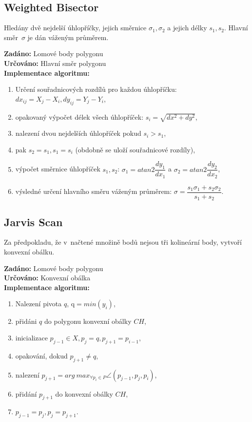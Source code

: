 \documentclass[a4paper, 12pt, oneside, titlepage]{article} %
\begin{document}
\subsection{Weighted Bisector} \label{wb}
Hledány dvě nejdelší úhlopříčky, jejich směrnice $\sigma_1, \sigma_2$ a jejich délky $s_1, s_2$. Hlavní směr~$\sigma$ je dán váženým průměrem.

\noindent\textbf{Zadáno:} Lomové body polygonu\\ 
\noindent\textbf{Určováno:} Hlavní směr polygonu\\
\noindent\textbf{Implementace algoritmu:}\\
\begin{enumerate}
\item Určení souřadnicových rozdílů pro každou úhlopříčku: $dx_{ij} = X_{j}-X_{i}, dy_{ij}=Y_{j}-Y_{i}$,
\item opakovaný výpočet délek všech úhlopříček: $s_i=\sqrt{dx^2+dy^2}$, 
\item \quad nalezení dvou nejdelších úhlopříček pokud $s_i>s_1$,
\item \quad \quad pak $s_2=s_1, s_1=s_i$ (obdobně se uloží souřadnicové rozdíly),
\item výpočet směrnice úhlopříček $s_1, s_2$: $\sigma_1=atan2\dfrac{dy_1}{dx_1}$ a $\sigma_2=atan2\dfrac{dy_2}{dx_2}$,
\item výsledné určení hlavního směru váženým průměrem: $\sigma=\dfrac{s_1\sigma_1+s_2\sigma_2}{s_1+s_2}$.
\end{enumerate}

\subsection{Jarvis Scan} \label{js}
Za předpokladu, že v~načtené množině bodů nejsou tři kolineární body, vytvoří konvexní obálku. 

\noindent\textbf{Zadáno:} Lomové body polygonu\\ 
\noindent\textbf{Určováno:} Konvexní obálka\\
\noindent\textbf{Implementace algoritmu:}\\
\begin{enumerate}
\item Nalezení pivota $q$, q$=min(y_i)$,
\item přidáni $q$ do polygonu konvexní obálky $CH$,
\item inicializace $p_{j-1}\in X, p_j=q, p_{j+1}=p_{i-1}$,
\item opakování, dokud $p_{j+1}\neq q$,
\item \quad nalezení $p_{j+1}=arg~max_{\forall p_i\in P}\angle(p_{j-1},p_j,p_i)$,
\item \quad přidání $p_{j+1}$ do konvexní obálky $CH$, 
\item \quad $p_{j-1}=p_j, p_j=p_{j+1}$.
\end{enumerate}
\end{document}
